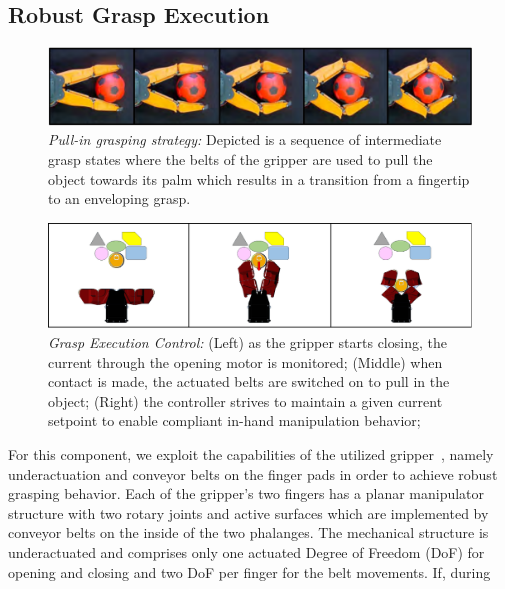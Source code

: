 \subsection{Robust Grasp Execution}
\label{subsec:grasp_execution}
%
\begin{figure}[!t]
 \centering
   \includegraphics[width = 1.0\linewidth]{figs/pull_in}
   \caption{\textit{Pull-in grasping strategy:} Depicted is a sequence of intermediate grasp states
     where the belts of the gripper are used to pull the object towards its palm which results in a
     transition from a fingertip to an enveloping grasp.}
   \vspace{-4mm}
   \label{fig:pull_in}
   \centering
 \end{figure}
 \begin{figure}[!t]
   \centering
 \includegraphics[width = 1\linewidth]{figs/vcg}
   \caption{\textit{Grasp Execution Control:} (Left) as the gripper starts closing, the current
     through the opening motor is monitored; (Middle) when contact is made, the actuated belts are
     switched on to pull in the object; (Right) the controller strives to maintain a given current
     setpoint to enable compliant in-hand manipulation behavior;}
   \label{fig:pull_in_control}
   \centering
   \vspace{-0.5cm}
 \end{figure}
%
 For this component, we exploit the capabilities of the utilized gripper~\cite{Tinc12}, namely
 underactuation and conveyor belts on the finger pads in order to achieve robust grasping
 behavior. Each of the gripper’s two fingers has a planar manipulator structure with two rotary
 joints and active surfaces which are implemented by conveyor belts on the inside of the two
 phalanges. The mechanical structure is underactuated and comprises only one actuated Degree of
 Freedom (DoF) for opening and closing and two DoF per finger for the belt movements. If, during
